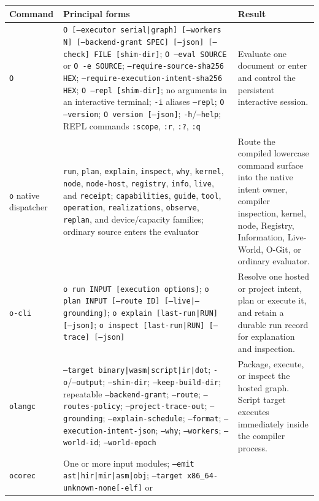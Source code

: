 \documentclass[11pt,oneside]{article}
\begin{document}
\begin{longtable}{P{0.18\textwidth} P{0.42\textwidth} P{0.32\textwidth}}
\toprule
\textbf{Command} & \textbf{Principal forms} & \textbf{Result} \\
\midrule
\endhead
\texttt{O} & \texttt{O [--executor serial|graph] [--workers N]
[--backend-grant SPEC] [--json] [--check] FILE [shim-dir]};
\texttt{O --eval SOURCE} or \texttt{O -e SOURCE};
\texttt{--require-source-sha256 HEX};
\texttt{--require-execution-intent-sha256 HEX};
\texttt{O --repl [shim-dir]}; no arguments in an interactive terminal;
\texttt{-i} aliases \texttt{--repl}; \texttt{O --version};
\texttt{O version [--json]}; \texttt{-h}/\texttt{--help}; REPL commands
\texttt{:scope}, \texttt{:r}, \texttt{:?}, \texttt{:q} &
Evaluate one document or enter and control the persistent interactive session. \\
\texttt{o} native dispatcher &
\texttt{run}, \texttt{plan}, \texttt{explain}, \texttt{inspect},
\texttt{why}, \texttt{kernel}, \texttt{node}, \texttt{node-host},
\texttt{registry}, \texttt{info}, \texttt{live}, and \texttt{receipt};
\texttt{capabilities}, \texttt{guide}, \texttt{tool}, \texttt{operation},
\texttt{realizations}, \texttt{observe}, \texttt{replan}, and device/capacity
families; ordinary source enters the evaluator &
Route the compiled lowercase command surface into the native intent owner,
compiler inspection, kernel, node, Registry, Information, Live-World, O-Git,
or ordinary evaluator. \\
\texttt{o-cli} &
\texttt{o run INPUT [execution options]};
\texttt{o plan INPUT [--route ID] [--live|--grounding]};
\texttt{o explain [last-run|RUN] [--json]};
\texttt{o inspect [last-run|RUN] [--trace] [--json]} &
Resolve one hosted or project intent, plan or execute it, and retain a durable
run record for explanation and inspection. \\
\texttt{olangc} & \texttt{--target binary|wasm|script|ir|dot};
\texttt{-o}/\texttt{--output}; \texttt{--shim-dir};
\texttt{--keep-build-dir}; repeatable
\texttt{--backend-grant}; \texttt{--route}; \texttt{--routes-policy};
\texttt{--project-trace-out}; \texttt{--grounding};
\texttt{--explain-schedule}; \texttt{--format};
\texttt{--execution-intent-json}; \texttt{--why}; \texttt{--workers};
\texttt{--world-id}; \texttt{--world-epoch} &
Package, execute, or inspect the hosted graph. Script target executes
immediately inside the compiler process. \\
\texttt{ocorec} & One or more input modules; \texttt{--emit
ast|hir|mir|asm|obj}; \texttt{--target x86\_64-unknown-none[-elf]} or

\end{longtable}
\end{document}
